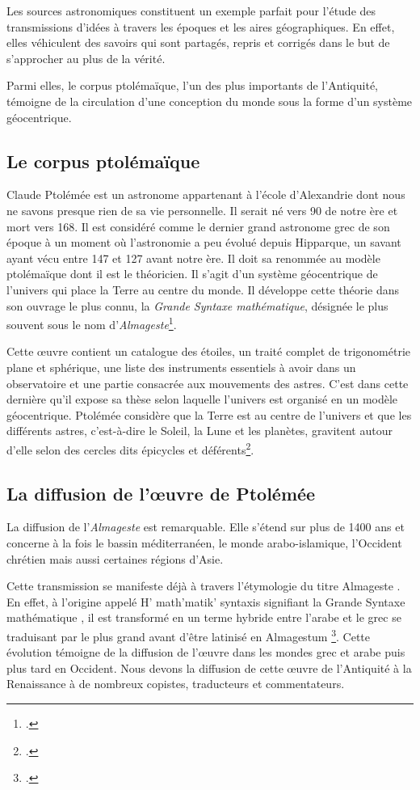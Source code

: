 Les sources astronomiques constituent un exemple parfait pour l'étude des transmissions d'idées à travers les époques et les aires géographiques. En effet, elles véhiculent des savoirs qui sont partagés, repris et corrigés dans le but de s'approcher au plus de la vérité. 

Parmi elles, le corpus ptolémaïque, l'un des plus importants de l'Antiquité, témoigne de la circulation d'une conception du monde sous la forme d'un système géocentrique. 

\subsection{Le corpus ptolémaïque}
Claude Ptolémée est un astronome appartenant à l'école d'Alexandrie dont nous ne
savons presque rien de sa vie personnelle. Il serait né vers 90 de notre ère et mort vers 168. Il est considéré comme le dernier grand astronome grec de son époque à un 
moment où l'astronomie a peu évolué depuis Hipparque, un savant ayant vécu entre 147 et 127 avant notre ère. Il doit sa renommée au modèle ptolémaïque dont il est le théoricien. Il s'agit d'un système géocentrique de l'univers qui place la Terre au centre du monde. Il développe cette théorie dans son ouvrage le plus connu, la \textit{Grande Syntaxe mathématique}, désignée le plus souvent sous le nom d'\textit{Almageste}\footcite{verdetLaubeLastronomieLaurore1990}. 

Cette œuvre contient un catalogue des étoiles, un traité complet de trigonométrie plane et sphérique, une liste des instruments essentiels à avoir dans un observatoire et une partie consacrée aux mouvements des astres. C'est dans cette dernière qu'il expose sa thèse selon laquelle l'univers est organisé en un modèle géocentrique. Ptolémée considère que la Terre est au centre de l'univers et que les différents astres, c'est-à-dire le Soleil, la Lune et les planètes, gravitent autour d'elle selon des cercles dits épicycles et déférents\footcite{costabelCLAUDEPTOLEMEE90}. 

\subsection{La diffusion de l'œuvre de Ptolémée}
La diffusion de l'\textit{Almageste} est remarquable. Elle s'étend sur plus de 1400 ans et concerne à la fois le bassin méditerranéen, le monde arabo-islamique, l'Occident chrétien mais aussi certaines régions d'Asie. 

Cette transmission se manifeste déjà à travers l'étymologie du titre \og Almageste \fg. En effet, à l'origine appelé \og H' math'matik' syntaxis \fg signifiant la \og Grande Syntaxe mathématique \fg, il est transformé en un terme hybride entre l'arabe et le grec se traduisant par \og le plus grand \fg avant d'être latinisé en \og Almagestum \fg\footcite{raymondjonesPtolemyAccomplishmentsBiography2025}. Cette évolution témoigne de la diffusion de l'œuvre dans les mondes grec et arabe puis plus tard en Occident. Nous devons la diffusion de cette œuvre de l'Antiquité à la Renaissance à de nombreux copistes, traducteurs et commentateurs. 


